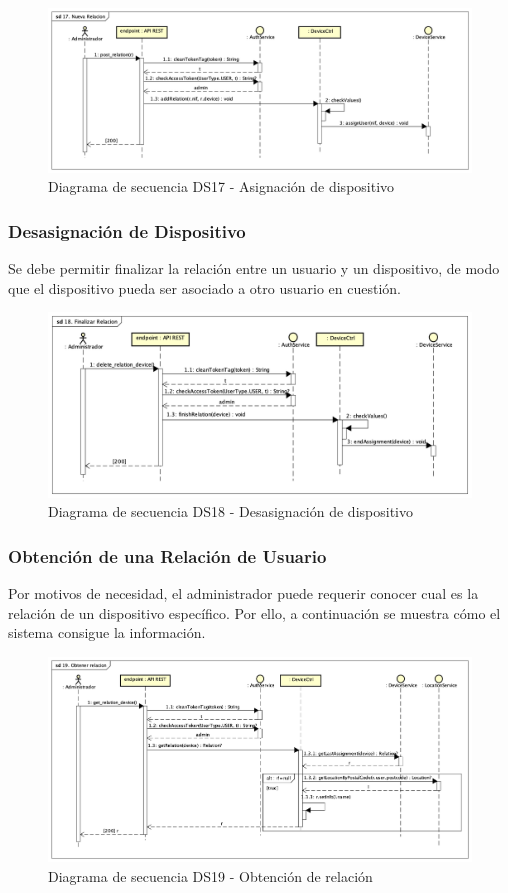 \begin{figure}[H]
    \centering
    \includegraphics[width=14cm]{./img/sequence/diagram/NuevaRelacion.png}
    \caption{Diagrama de secuencia DS17 - Asignación de dispositivo}
    \label{fig:seq.AddUser}
\end{figure}

\subsubsection{Desasignación de Dispositivo}

Se debe permitir finalizar la relación entre un usuario y un dispositivo, de modo que el dispositivo pueda ser asociado a otro usuario en cuestión.

\begin{figure}[H]
    \centering
    \includegraphics[width=14cm]{./img/sequence/diagram/FinalizarRelacion.png}
    \caption{Diagrama de secuencia DS18 - Desasignación de dispositivo}
    \label{fig:seq.AddUser}
\end{figure}

\subsubsection{Obtención de una Relación de Usuario}

Por motivos de necesidad, el administrador puede requerir conocer cual es la relación de un dispositivo específico. Por ello, a continuación se muestra cómo el sistema consigue la información.


\begin{figure}[H]
    \centering
    \includegraphics[width=14cm]{./img/sequence/diagram/ObtenerRelacion.png}
    \caption{Diagrama de secuencia DS19 - Obtención de relación}
    \label{fig:seq.AddUser}
\end{figure}
